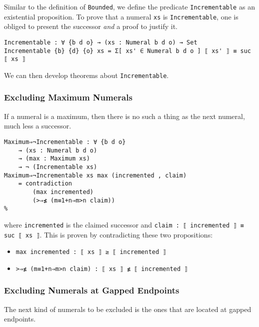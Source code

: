 \documentclass[\main/thesis.tex]{subfiles}
\begin{document}
Similar to the definition of \lstinline|Bounded|, we define the predicate
\lstinline|Incrementable| as an existential proposition.
To prove that a numeral \lstinline|xs| is \lstinline|Incrementable|,
one is obliged to present the successor \textit{and} a proof to justify it.

\begin{lstlisting}[basicstyle=\ttfamily\scriptsize]
Incrementable : ∀ {b d o} → (xs : Numeral b d o) → Set
Incrementable {b} {d} {o} xs = Σ[ xs' ∈ Numeral b d o ] ⟦ xs' ⟧ ≡ suc ⟦ xs ⟧
\end{lstlisting}

We can then develop theorems about \lstinline|Incrementable|.

\subsubsection{Excluding Maximum Numerals}

If a numeral is a maximum, then there is no such a thing as the next numeral,
much less a successor.

\begin{lstlisting}
Maximum⇒¬Incrementable : ∀ {b d o}
    → (xs : Numeral b d o)
    → (max : Maximum xs)
    → ¬ (Incrementable xs)
Maximum⇒¬Incrementable xs max (incremented , claim)
    = contradiction
        (max incremented)
        (>⇒≰ (m≡1+n⇒m>n claim))
%
\end{lstlisting}
where \lstinline|incremented| is the claimed successor
and \lstinline|claim : ⟦ incremented ⟧ ≡ suc ⟦ xs ⟧|.
This is proven by contradicting these two propositions:

\begin{itemize}
    \item \lstinline|max incremented : ⟦ xs ⟧ ≥ ⟦ incremented ⟧|
    \item \lstinline|>⇒≰ (m≡1+n⇒m>n claim) : ⟦ xs ⟧ ≰ ⟦ incremented ⟧|
\end{itemize}

\subsubsection{Excluding Numerals at Gapped Endpoints}

The next kind of numerals to be excluded is the ones that are located at gapped
endpoints.

\begin{center}
    \begin{adjustbox}{max width=\textwidth}
    \end{adjustbox}
\end{center}
\end{document}
